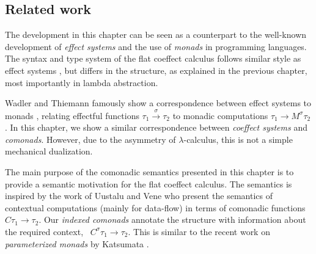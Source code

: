 
\subsection{Related work}

The development in this chapter can be seen as a counterpart to the well-known development of 
\emph{effect systems} \cite{effects-gifford} and the use of \emph{monads} \cite{monad-notions}
in programming languages. The syntax and type system of the flat coeffect calculus follows 
similar style as effect systems \cite{effects-polymorphic,effects-talpin-et-al}, but differs
in the structure, as explained in the previous chapter, most importantly in lambda abstraction.

Wadler and Thiemann famously show a correspondence between effect systems to monads 
\cite{monads-effects-marriage}, relating effectful functions $\tau_1 \xrightarrow{\sigma} \tau_2$ 
to monadic computations $\tau_1 \rightarrow M^\sigma \tau_2$. In this chapter, we show a similar
correspondence between \emph{coeffect systems} and \emph{comonads}. However, due to the asymmetry 
of $\lambda$-calculus, this is not a simple mechanical dualization.

The main purpose of the comonadic semantics presented in this chapter is to provide a semantic
motivation for the flat coeffect calculus. The semantics is inspired by the work of Uustalu and
Vene \cite{comonads-notions} who present the semantics of contextual computations (mainly for
data-flow) in terms of comonadic functions $C \tau_1 \rightarrow \tau_2$. Our \emph{indexed 
comonads} annotate the structure with information about the required context, \ie~$C^\sigma \tau_1 \rightarrow \tau_2$.
This is similar to the recent work on \emph{parameterized monads} by Katsumata \cite{monads-parametric}.




%                                                            
%                                                           


